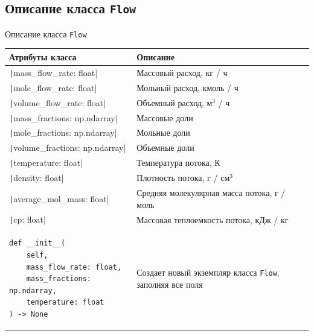 \documentclass[aspectratio=169, mathserif]{beamer}%
\begin{document}
\subsection{Описание класса \texttt{Flow}}
\begin{frame}[fragile]{Описание класса \texttt{Flow}}
\scriptsize
\begin{table}[h!]
	\centering
	\renewcommand{\arraystretch}{1.2}
	\begin{tabular}{|p{.49\linewidth}|p{.49\linewidth}|}
		\hline
		\textbf{Атрибуты класса} & \textbf{Описание}  \\
		\hline
		\texttt|mass_flow_rate: float| & Массовый расход, кг / ч \\
		\hline
		\texttt|mole_flow_rate: float| & Мольный расход, кмоль / ч \\
		\hline
		\texttt|volume_flow_rate: float| & Объемный расход, м$^3$ / ч \\
		\hline
		\texttt|mass_fractions: np.ndarray| & Массовые доли \\
		\hline
		\texttt|mole_fractions: np.ndarray| & Мольные доли \\
		\hline
		\texttt|volume_fractions: np.ndarray| & Объемные доли \\
		\hline
		\texttt|temperature: float| & Температура потока, К \\
		\hline
		\texttt|density: float| & Плотность потока, г / см$^3$ \\
		\hline
		\texttt|average_mol_mass: float| & Средняя молекулярная масса потока, г / моль \\
		\hline
		\texttt|cp: float| & Массовая теплоемкость потока, кДж / кг \\
		\hline
\begin{minipage}{\linewidth}
\begin{verbatim}
def __init__(
    self,
    mass_flow_rate: float,
    mass_fractions: np.ndarray,
    temperature: float
) -> None
\end{verbatim}
\end{minipage}
		& Создает новый экземпляр класса \texttt{Flow}, заполняя все поля \\
		\hline
	\end{tabular}
\end{table}
\vfill
\end{frame}
\end{document}
